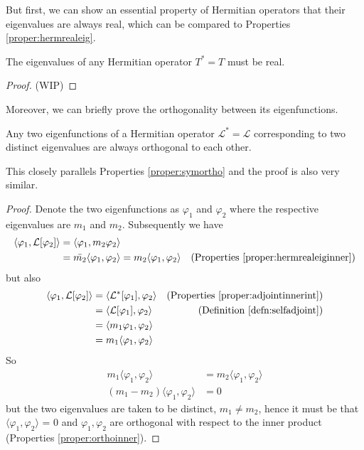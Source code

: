 But first, we can show an essential property of Hermitian operators that their eigenvalues are always real, which can be compared to Properties \ref{proper:hermrealeig}.
\begin{proper}
\label{proper:hermrealeiginner}
The eigenvalues of any Hermitian operator $T^* = T$ must be real.
\end{proper}
\begin{proof}
(WIP)
\end{proof}
Moreover, we can briefly prove the orthogonality between its eigenfunctions.
\begin{proper}
\label{proper:orthogonalherm}
Any two eigenfunctions of a Hermitian operator $\mathcal{L}^* = \mathcal{L}$ corresponding to two distinct eigenvalues are always orthogonal to each other.
\end{proper}
This closely parallels Properties \ref{proper:symortho} and the proof is also very similar.
\begin{proof}
Denote the two eigenfunctions as $\varphi_1$ and $\varphi_2$ where the respective eigenvalues are $m_1$ and $m_2$. Subsequently we have
\begin{align*}
\langle \varphi_1, \mathcal{L}[\varphi_2] \rangle &= \langle \varphi_1, m_2\varphi_2 \rangle \\
&= \bar{m_2} \langle \varphi_1, \varphi_2 \rangle = m_2 \langle \varphi_1, \varphi_2 \rangle & \text{(Properties \ref{proper:hermrealeiginner})}
\end{align*}
but also
\begin{align*}
\langle \varphi_1, \mathcal{L}[\varphi_2] \rangle &= \langle \mathcal{L}^*[\varphi_1], \varphi_2 \rangle & \text{(Properties \ref{proper:adjointinnerint})} \\
&= \langle \mathcal{L}[\varphi_1], \varphi_2 \rangle & \text{(Definition \ref{defn:selfadjoint})} \\
&= \langle m_1\varphi_1, \varphi_2 \rangle \\
&= m_1 \langle \varphi_1, \varphi_2 \rangle
\end{align*}
So
\begin{align*}
m_1 \langle \varphi_1, \varphi_2 \rangle &= m_2 \langle \varphi_1, \varphi_2 \rangle \\
(m_1 - m_2) \langle \varphi_1, \varphi_2 \rangle &= 0
\end{align*}
but the two eigenvalues are taken to be distinct, $m_1 \neq m_2$, hence it must be that $\langle \varphi_1, \varphi_2 \rangle$ = 0 and $\varphi_1, \varphi_2$ are orthogonal with respect to the inner product (Properties \ref{proper:orthoinner}).
\end{proof}
